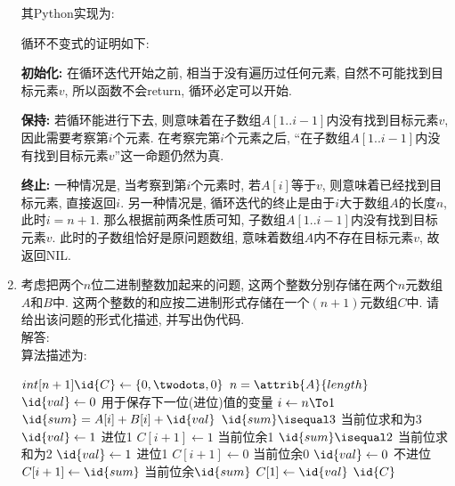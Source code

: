 \documentclass[UTF8,a4paper,zihao=-4,oneside,onecolumn,scheme=chinese,autoindent=true]{ctexbook}
\begin{document}
\begin{enumerate}
{          其Python实现为:

          

          循环不变式的证明如下:

          \textbf{初始化: }在循环迭代开始之前, 相当于没有遍历过任何元素, 自然不可能找到目标元素$v$, 所以函数不会return, 循环必定可以开始.

          \textbf{保持: }若循环能进行下去, 则意味着在子数组$A[1..i-1]$内没有找到目标元素$v$, 因此需要考察第$i$个元素. 在考察完第$i$个元素之后, “在子数组$A[1..i-1]$内没有找到目标元素$v$”这一命题仍然为真.

          \textbf{终止: }一种情况是, 当考察到第$i$个元素时, 若$A[i]$等于$v$, 则意味着已经找到目标元素, 直接返回$i$. 另一种情况是, 循环迭代的终止是由于$i$大于数组$A$的长度$n$, 此时$i=n+1$. 那么根据前两条性质可知, 子数组$A[1..i-1]$内没有找到目标元素$v$. 此时的子数组恰好是原问题数组, 意味着数组$A$内不存在目标元素$v$, 故返回NIL.
          }
    \item {
          考虑把两个$n$位二进制整数加起来的问题, 这两个整数分别存储在两个$n$元数组$A$和$B$中. 这两个整数的和应按二进制形式存储在一个$(n+1)$元数组$C$中. 请给出该问题的形式化描述, 并写出伪代码.\\
          解答: \\
          算法描述为:
          \begin{codebox}
              \li $int[n+1] \id{C} \gets \{0,\twodots,0\}$ \RComment $n=\attrib{A}{length}$
              \li $\id{val} \gets 0$ \RComment 用于保存下一位(进位)值的变量
              \li \For $i \gets n \To 1$
              \li     \Do
              $\id{sum} = A[i]+B[i]+\id{val}$
              \li     \If $\id{sum} \isequal 3$ \Then \RComment 当前位求和为3
              \li         $\id{val} \gets 1$ \RComment 进位1
              \li         $C[i+1] \gets 1$ \RComment 当前位余1
              \li     \ElseIf $\id{sum} \isequal 2$ \Then \RComment 当前位求和为2
              \li         $\id{val} \gets 1$ \RComment 进位1
              \li         $C[i+1] \gets 0$ \RComment 当前位余0
              \li     \Else
              \li         $\id{val} \gets 0$ \RComment 不进位
              \li         $C[i+1] \gets \id{sum}$ \RComment 当前位余$\id{sum}$
              \End
              \End
              \li $C[1] \gets \id{val}$
              \li \Return $\id{C}$
          \end{codebox}
          }
\end{enumerate}
\end{document}
